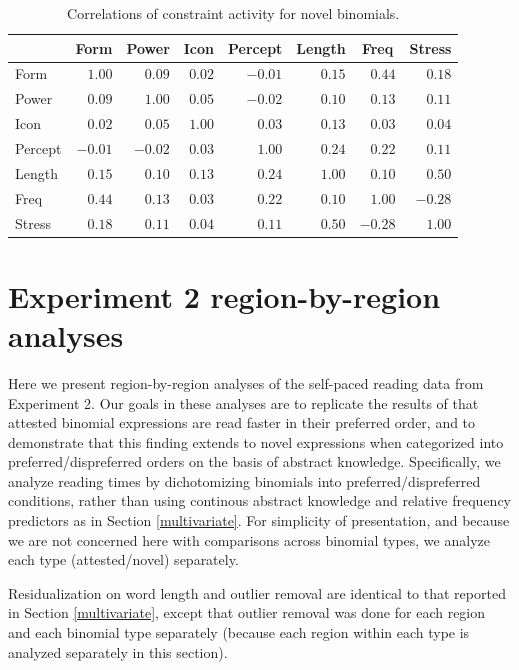 \documentclass[authoryear]{elsarticle}
\begin{document}
\begin{table}[!tbp]
\begin{center}
\begin{tabular}{lrrrrrrr}
\hline\hline
\multicolumn{1}{l}{}&\multicolumn{1}{c}{Form}&\multicolumn{1}{c}{Power}&\multicolumn{1}{c}{Icon}&\multicolumn{1}{c}{Percept}&\multicolumn{1}{c}{Length}&\multicolumn{1}{c}{Freq}&\multicolumn{1}{c}{Stress}\tabularnewline
\hline
Form&$ 1.00$&$ 0.09$&$0.02$&$-0.01$&$0.15$&$ 0.44$&$ 0.18$\tabularnewline
Power&$ 0.09$&$ 1.00$&$0.05$&$-0.02$&$0.10$&$ 0.13$&$ 0.11$\tabularnewline
Icon&$ 0.02$&$ 0.05$&$1.00$&$ 0.03$&$0.13$&$ 0.03$&$ 0.04$\tabularnewline
Percept&$-0.01$&$-0.02$&$0.03$&$ 1.00$&$0.24$&$ 0.22$&$ 0.11$\tabularnewline
Length&$ 0.15$&$ 0.10$&$0.13$&$ 0.24$&$1.00$&$ 0.10$&$ 0.50$\tabularnewline
Freq&$ 0.44$&$ 0.13$&$0.03$&$ 0.22$&$0.10$&$ 1.00$&$-0.28$\tabularnewline
Stress&$ 0.18$&$ 0.11$&$0.04$&$ 0.11$&$0.50$&$-0.28$&$ 1.00$\tabularnewline
\hline
\end{tabular}
\end{center}
\caption{Correlations of constraint activity for novel binomials.} \label{t:constraint-cor-n}

\end{table}

\section{Experiment 2 region-by-region analyses}\label{word-by-word}
Here we present region-by-region analyses of the self-paced reading data from Experiment 2. Our goals in these analyses are to replicate the results of \citet{SiyanovaChanturia:2011ep} that attested binomial expressions are read faster in their preferred order, and to demonstrate that this finding extends to novel expressions when categorized into preferred/dispreferred orders on the basis of abstract knowledge. Specifically, we analyze reading times by dichotomizing binomials into preferred/dispreferred conditions, rather than using continous abstract knowledge and relative frequency predictors as in Section \ref{multivariate}. For simplicity of presentation, and because we are not concerned here with comparisons across binomial types, we analyze each type (attested/novel) separately.




Residualization on word length and outlier removal are identical to that reported in Section \ref{multivariate}, except that outlier removal was done for each region and each binomial type separately (because each region within each type is analyzed separately in this section).
\end{document}
